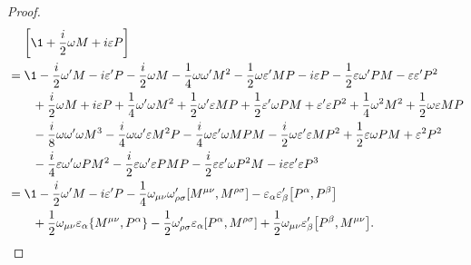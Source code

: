 \begin{mdframed}
\begin{proof}
\begin{align*}
        &\quad\, \left[ \1 + \frac{i}{2} \omega M + i \epsilon P  \right] \\
        &= \1 - \frac{i}{2} \omega' M - i \epsilon' P - \frac{i}{2} \omega M - \frac{1}{4} \omega \omega' M^2 - \frac{1}{2} \omega \epsilon' M P - i \epsilon P - \frac{1}{2} \epsilon \omega' P M - \epsilon \epsilon' P^2 \\
        &\quad\quad +\frac{i}{2}\omega M + i \epsilon P +\frac{1}{4} \omega' \omega M^2 + \frac{1}{2} \omega' \epsilon M P +\frac{1}{2} \epsilon' \omega P M + \epsilon' \epsilon P^2 +\frac{1}{4} \omega^2 M^2 + \frac{1}{2} \omega \epsilon M P \\
        &\quad\quad -\frac{i}{8} \omega \omega' \omega M^3 - \frac{i}{4} \omega \omega' \epsilon M^2 P -\frac{i}{4} \omega \epsilon' \omega M P M - \frac{i}{2} \omega \epsilon' \epsilon M P^2 +\frac{1}{2} \epsilon \omega P M + \epsilon^2 P^2 \\
        &\quad\quad -\frac{i}{4} \epsilon \omega' \omega P M^2 - \frac{i}{2} \epsilon \omega' \epsilon P M P -\frac{i}{2} \epsilon \epsilon' \omega P^2 M - i \epsilon \epsilon' \epsilon P^3 \\
        &= \1 -\frac{i}{2} \omega' M - i \epsilon' P - \frac{1}{4} \omega_{\mu\nu} \omega'_{\rho\sigma} \comm{M^{\mu\nu}}{M^{\rho\sigma}} - \epsilon_\alpha \epsilon'_\beta \comm{P^\alpha}{P^\beta} \\
        &\quad\quad +\frac{1}{2} \omega_{\mu\nu} \epsilon_\alpha \{ M^{\mu\nu}, P^\alpha \} - \frac{1}{2} \omega'_{\rho\sigma} \epsilon_\alpha \comm{P^\alpha}{M^{\rho\sigma}} + \frac{1}{2} \omega_{\mu\nu} \epsilon'_\beta \comm{P^\beta}{M^{\mu\nu}}.
    \end{align*}


\end{proof}
\end{mdframed}
